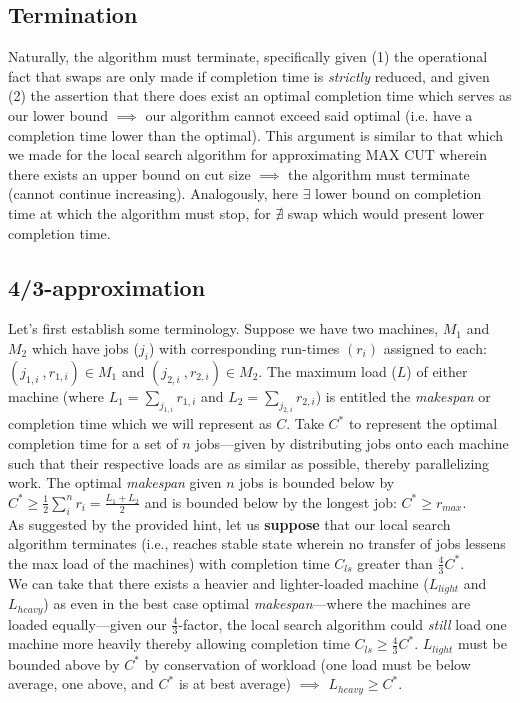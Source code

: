 \documentclass[conference]{styles/acmsiggraph}
\newcommand{\?}{\stackrel{?}{=}}
\DeclareRobustCommand{\mybox}[2][gray!20]{%
\begin{tcolorbox}[   %
        breakable,
        left=0pt,
        right=0pt,
        top=0pt,
        bottom=0pt,
        colback=#1,
        colframe=#1,
        width=\dimexpr\textwidth\relax, 
        enlarge left by=0mm,
        boxsep=5pt,
        arc=0pt,outer arc=0pt,
        ]
        #2
\end{tcolorbox}
}
\begin{document}
\subsection{Termination}
\mybox{
Naturally, the algorithm must terminate, specifically given (1) the operational fact that swaps are only made if completion time is \textit{strictly} reduced, and given (2) the assertion that there does exist an optimal completion time which serves as our lower bound $\implies$ our algorithm cannot exceed said optimal (i.e. have a completion time lower than the optimal).  This argument is similar to that which we made for the local search algorithm for approximating MAX CUT wherein there exists an upper bound on cut size $\implies$ the algorithm must terminate (cannot continue increasing).  Analogously, here $\exists$ lower bound on completion time at which the algorithm must stop, for $\nexists$ swap which would present lower completion time.}

\subsection{4/3-approximation}
Let's first establish some terminology.  Suppose we have two machines, $M_1$ and $M_2$ which have jobs ($j_i$) with corresponding run-times $(r_i)$ assigned to each: $(j_{1,i}\ ,r_{1,i}) \in M_1$ and $(j_{2,i}\ ,r_{2,i}) \in M_2$.  The maximum load ($L$) of either machine (where $L_{1} = \sum_{j_{1,i}} r_{1,i}$ and $L_{2} = \sum_{j_{2,i}} r_{2,i}$) is entitled the \textit{makespan} or completion time which we will represent as $C$. Take $C^*$ to represent the optimal completion time for a set of $n$ jobs---given by distributing jobs onto each machine such that their respective loads are as similar as possible, thereby parallelizing work.  The optimal \textit{makespan} given $n$ jobs is bounded below by $C^* \geq \frac{1}{2}\sum_{i}^{n}r_i = \frac{L_1 + L_2}{2}$ and is bounded below by the longest job: $C^* \geq r_{max}$.\\

As suggested by the provided hint, let us \textbf{suppose} that our local search algorithm terminates (i.e., reaches stable state wherein no transfer of jobs lessens the max load of the machines) with completion time $C_{ls}$ greater than $\frac{4}{3}C^*$.\\

We can take that there exists a heavier and lighter-loaded machine ($L_{light}$ and $L_{heavy}$) as even in the best case optimal \textit{makespan}---where the machines are loaded equally---given our $\frac{4}{3}$-factor, the local search algorithm could \textit{still} load one machine more heavily thereby allowing completion time $C_{ls} \geq \frac{4}{3}C^*$.  $L_{light}$ must be bounded above by $C^*$ by conservation of workload (one load must be below average, one above, and $C^*$ is at best average) $\implies$ $L_{heavy} \geq C^*$.\\
\end{document}
